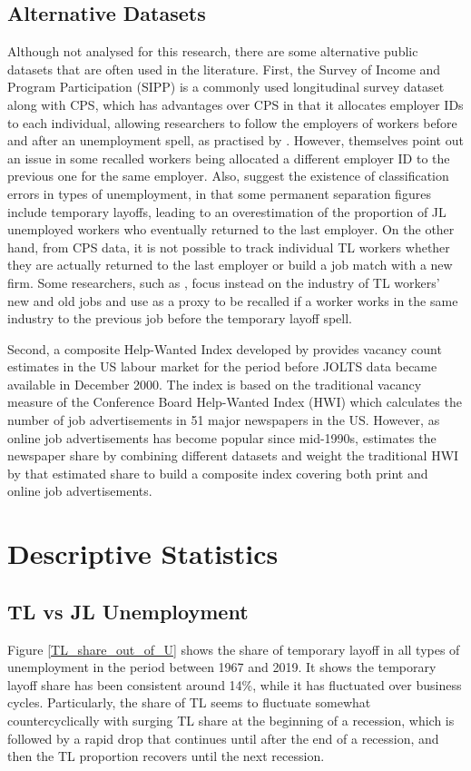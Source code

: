 \documentclass[a4paper, 11pt, tikz]{article}
\begin{document}
\subsection{Alternative Datasets}

Although not analysed for this research, there are some alternative public datasets that are often used in the literature.
First, the Survey of Income and Program Participation (SIPP) is a commonly used longitudinal survey dataset along with CPS, which has advantages over CPS in that it allocates employer IDs to each individual, allowing researchers to follow the employers of workers before and after an unemployment spell, as practised by \cite{fujita2017recall}.
However, \cite{fujita2017recall} themselves point out an issue in some recalled workers being allocated a different employer ID to the previous one for the same employer.
Also, \cite{gertler2022temporary} suggest the existence of classification errors in types of unemployment, in that some permanent separation figures include temporary layoffs, leading to an overestimation of the proportion of JL unemployed workers who eventually returned to the last employer.
On the other hand, from CPS data, it is not possible to track individual TL workers whether they are actually returned to the last employer or build a job match with a new firm.
Some researchers, such as \cite{forsythe2022where}, focus instead on the industry of TL workers' new and old jobs and use as a proxy to be recalled if a worker works in the same industry to the previous job before the temporary layoff spell.

Second, a composite Help-Wanted Index developed by \cite{barnichon2010building} provides vacancy count estimates in the US labour market for the period before JOLTS data became available in December 2000.
The index is based on the traditional vacancy measure of the Conference Board Help-Wanted Index (HWI) which calculates the number of job advertisements in 51 major newspapers in the US.
However, as online job advertisements has become popular since mid-1990s, \cite{barnichon2010building} estimates the newspaper share by combining different datasets and weight the traditional HWI by that estimated share to build a composite index covering both print and online job advertisements.

\section{Descriptive Statistics}
\subsection{TL vs JL Unemployment}
Figure \ref{TL_share_out_of_U} shows the share of temporary layoff in all types of unemployment in the period between 1967 and 2019.
It shows the temporary layoff share has been consistent around 14\%, while it has fluctuated over business cycles.
Particularly, the share of TL seems to fluctuate somewhat countercyclically with surging TL share at the beginning of a recession, which is followed by a rapid drop that continues until after the end of a recession, and then the TL proportion recovers until the next recession.
\end{document}
